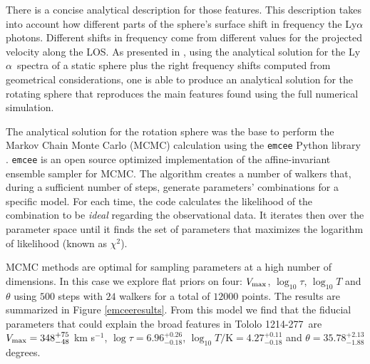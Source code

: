 \documentclass[a4paper, usenatbib, 12pt]{article}
\newcommand{\tol}{Tololo 1214-277}
\newcommand{\lya}{Ly$\alpha$}
\begin{document}
{There is a concise analytical description for those features.
This description takes into account how different parts of the
sphere's surface shift in frequency the \lya photons. 
Different shifts in frequency come from different values for the projected
velocity along the LOS. 
As presented in \cite{CLARA}, using the analytical solution for the
\lya\ spectra of a static sphere plus the right frequency shifts
computed from geometrical considerations, one is able to produce an
analytical solution for the rotating sphere that reproduces the main
features found using the full numerical simulation.

The analytical solution for the rotation sphere was the base to
perform the Markov Chain Monte Carlo (MCMC) calculation using the
\texttt{emcee} Python library \cite{2013PASP..125..306F}. \texttt{emcee} 
is an open source optimized implementation of the affine-invariant 
ensemble sampler for MCMC. The algorithm creates a number of walkers that,
during a sufficient number of steps, generate parameters' combinations for
a specific model. For each time, the code calculates the likelihood of the
combination to be \textit{ideal} regarding the observational data. It 
iterates then over the parameter space until it finds the set of
parameters that maximizes the logarithm of likelihood (known as $\chi^2$). 

MCMC methods are optimal for sampling parameters at a high number of 
dimensions. In this case we explore flat priors on four: $V_{\rm max}$, 
$\log_{10}\tau$, $\log_{10} T$ and $\theta$ using $500$ steps with $24$ 
walkers for a total of $12000$ points. The results are summarized in 
Figure \ref{emceeresults}. From this model we find that the fiducial 
parameters that could explain the broad features in \tol\ are 
$V_{\rm max}=348^{+75}_{-48}$ km s$^{-1}$, $\log \tau = 6.96^{+0.26}_{-0.18}$, 
$\log_{10} T/\mathrm {K} = 4.27^{+0.11}_{-0.18}$ and $\theta = 35.78^{+2.13}_{-1.88}$ 
degrees.


}
\end{document}
